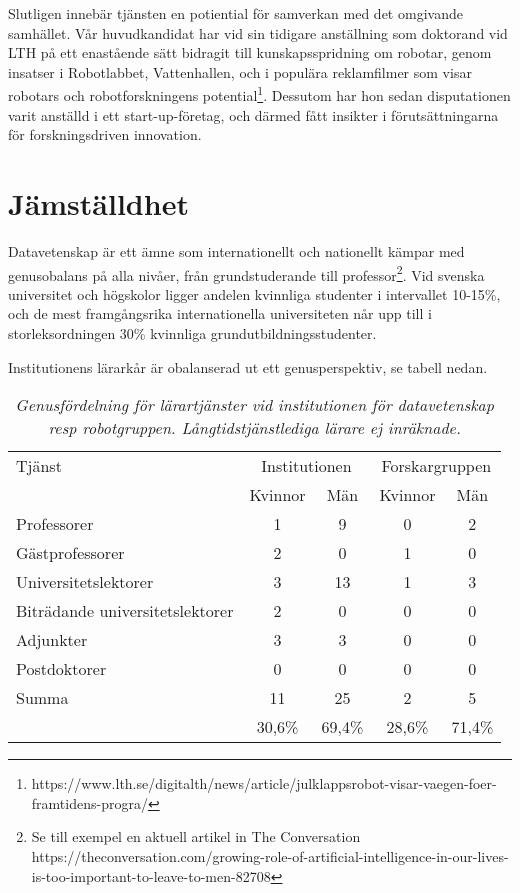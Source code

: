 \documentclass[11pt,a4paper]{article}
\begin{document}
Slutligen innebär tjänsten en potiential för samverkan med det omgivande samhället. Vår huvudkandidat har vid sin tidigare anställning som doktorand vid LTH på ett enastående sätt bidragit till kunskapsspridning om robotar, genom insatser i Robotlabbet, Vattenhallen, och i populära reklamfilmer som visar robotars och robotforskningens potential\footnote{https://www.lth.se/digitalth/news/article/julklappsrobot-visar-vaegen-foer-framtidens-progra/}. Dessutom har hon sedan disputationen varit anställd i ett start-up-företag, och därmed fått insikter i förutsättningarna för forskningsdriven innovation. 

\section{Jämställdhet}
Datavetenskap är ett ämne som internationellt och nationellt kämpar med genusobalans på alla nivåer, från grundstuderande till professor\footnote{Se till exempel en aktuell artikel in The Conversation https://theconversation.com/growing-role-of-artificial-intelligence-in-our-lives-is-too-important-to-leave-to-men-82708}. Vid svenska universitet och högskolor ligger andelen kvinnliga studenter i intervallet 10-15\%, och de mest framgångsrika internationella universiteten når upp till i storleksordningen 30\% kvinnliga grundutbildningsstudenter.

Institutionens lärarkår är obalanserad ut ett genusperspektiv,  se tabell nedan. 

\begin{table}[h!]
\caption{\textit{Genusfördelning för lärartjänster vid institutionen för datavetenskap resp robotgruppen. Långtidstjänstlediga lärare ej inräknade.}}
\begin{center}
\begin{tabular}{ l |c|c|c|c|}
Tjänst	&	\multicolumn{2}{|c|}{Institutionen} & \multicolumn{2}{|c|}{Forskargruppen}\\
	&	Kvinnor	& Män	&	Kvinnor	& Män	\\
\hline
Professorer	&	1&	9&	0&	2\\
Gästprofessorer & 2 & 0 & 1 & 0 \\
Universitetslektorer&	3&	13&	1&	3\\
Biträdande universitetslektorer&	2\footnotemark&	0&	0&	0\\ 
Adjunkter  &	3&	3&	0&	0\\
Postdoktorer&	0&	0&	0&	0\\
\hline
Summa	& 11 & 25 & 2 & 5\\
 & 30,6\% & 69,4\%& 28,6\%&71,4\%\\
\end{tabular}
\end{center}
\label{table:genus}
\end{table}%
\end{document}
